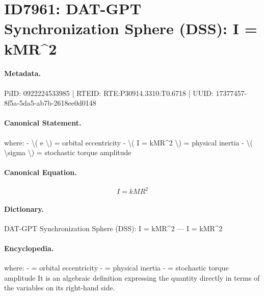 \section*{ID7961: DAT-GPT Synchronization Sphere (DSS): I = kMR\textasciicircum{}2}
\paragraph{Metadata.}
PiID: 0922224533985 | RTEID: RTE:P30914.3310:T0.6718 | UUID: 17377457-8f5a-5da5-ab7b-2618ee0d0148

\paragraph{Canonical Statement.}
where: - \textbackslash{}( e \textbackslash{}) = orbital eccentricity - \textbackslash{}( I = kMR\textasciicircum{}2 \textbackslash{}) = physical inertia - \textbackslash{}( \textbackslash{}sigma \textbackslash{}) = stochastic torque amplitude

\paragraph{Canonical Equation.}
\[
I = kMR^2
\]

\paragraph{Dictionary.}
DAT-GPT Synchronization Sphere (DSS): I = kMR\textasciicircum{}2 — I = kMR\textasciicircum{}2

\paragraph{Encyclopedia.}
where: - = orbital eccentricity - = physical inertia - = stochastic torque amplitude It is an algebraic definition expressing the quantity directly in terms of the variables on its right-hand side.
